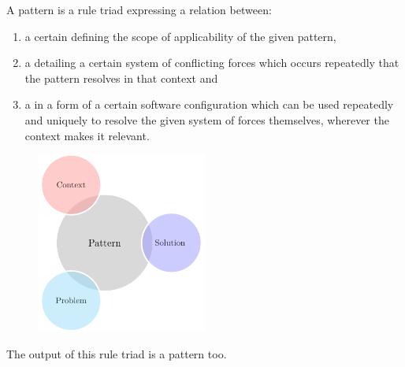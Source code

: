 \begin{defn}
A pattern is a rule triad expressing a relation between:
\begin{enumerate}
  \item a certain  defining the scope of applicability of the given pattern,
  \item a  detailing a certain system of conflicting forces which occurs repeatedly that the pattern resolves in that context and
  \item a  in a form of a certain software configuration which can be used repeatedly and uniquely to resolve the given system of forces themselves, wherever the context makes it relevant.
\end{enumerate}
\par\vspace{-1.8\baselineskip}
\qedhere
\end{defn}

\begin{figure}
  \begin{center}
    \includegraphics[width=0.5\textwidth]{designpatterns/patterns-triad}
  \end{center}
\end{figure}


The output of this rule triad is a pattern too.

\vspace{4mm}


